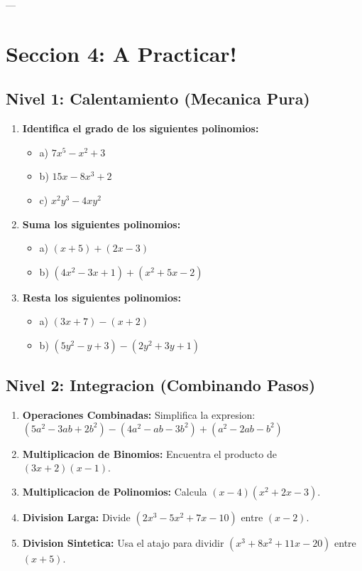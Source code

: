 \documentclass[12pt,a4paper]{article}
\begin{document}
---

\section*{Seccion 4: A Practicar!}

\subsection*{Nivel 1: Calentamiento (Mecanica Pura)}\begin{enumerate}
    \item \textbf{Identifica el grado de los siguientes polinomios:}
    \begin{itemize}
        \item a) $7x^5 - x^2 + 3$
        \item b) $15x - 8x^3 + 2$
        \item c) $x^2y^3 - 4xy^2$
    \end{itemize}
    \item \textbf{Suma los siguientes polinomios:}
    \begin{itemize}
        \item a) $(x+5) + (2x-3)$
        \item b) $(4x^2 - 3x + 1) + (x^2 + 5x - 2)$
    \end{itemize}
    \item \textbf{Resta los siguientes polinomios:}
    \begin{itemize}
        \item a) $(3x+7) - (x+2)$
        \item b) $(5y^2 - y + 3) - (2y^2 + 3y + 1)$
    \end{itemize}
\end{enumerate}

\subsection*{Nivel 2: Integracion (Combinando Pasos)}\begin{enumerate}
    \item \textbf{Operaciones Combinadas:} Simplifica la expresion:
    $(5a^2 - 3ab + 2b^2) - (4a^2 - ab - 3b^2) + (a^2 - 2ab - b^2)$
    \item \textbf{Multiplicacion de Binomios:} Encuentra el producto de $(3x + 2)(x - 1)$.
    \item \textbf{Multiplicacion de Polinomios:} Calcula $(x-4)(x^2 + 2x - 3)$.
    \item \textbf{Division Larga:} Divide $(2x^3 - 5x^2 + 7x - 10)$ entre $(x-2)$.
    \item \textbf{Division Sintetica:} Usa el atajo para dividir $(x^3 + 8x^2 + 11x - 20)$ entre $(x+5)$.
\end{enumerate}
\end{document}
